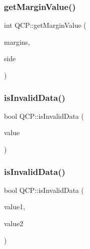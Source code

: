 \subsubsection{\texorpdfstring{getMarginValue()}{getMarginValue()}}
{\footnotesize\ttfamily int Q\+C\+P\+::get\+Margin\+Value (\begin{DoxyParamCaption}\item[{const Q\+Margins \&}]{margins,  }\item[{\mbox{\hyperlink{namespace_q_c_p_a7e487e3e2ccb62ab7771065bab7cae54}{Q\+C\+P\+::\+Margin\+Side}}}]{side }\end{DoxyParamCaption})\hspace{0.3cm}{\ttfamily [inline]}}

\mbox{\label{namespace_q_c_p_a07ab701c05329089f933b9cae2638a63}} 
\subsubsection{\texorpdfstring{isInvalidData()}{isInvalidData()}\hspace{0.1cm}{\footnotesize\ttfamily [1/2]}}
{\footnotesize\ttfamily bool Q\+C\+P\+::is\+Invalid\+Data (\begin{DoxyParamCaption}\item[{double}]{value }\end{DoxyParamCaption})\hspace{0.3cm}{\ttfamily [inline]}}

\mbox{\label{namespace_q_c_p_a728903e5c3dd17847bee280f4005496f}} 
\subsubsection{\texorpdfstring{isInvalidData()}{isInvalidData()}\hspace{0.1cm}{\footnotesize\ttfamily [2/2]}}
{\footnotesize\ttfamily bool Q\+C\+P\+::is\+Invalid\+Data (\begin{DoxyParamCaption}\item[{double}]{value1,  }\item[{double}]{value2 }\end{DoxyParamCaption})\hspace{0.3cm}{\ttfamily [inline]}}

